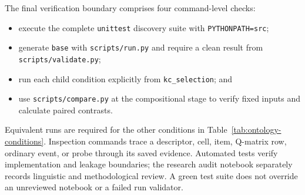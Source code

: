 The final verification boundary comprises four command-level checks:
\begin{itemize}
  \raggedright
  \item execute the complete \texttt{unittest} discovery suite with
        \texttt{PYTHONPATH=src};
  \item generate \texttt{base} with \texttt{scripts/run.py} and require a
        clean result from \texttt{scripts/validate.py};
  \item run each child condition explicitly from \texttt{kc\_selection}; and
  \item use \texttt{scripts/compare.py} at the compositional stage to verify
        fixed inputs and calculate paired contrasts.
\end{itemize}
Equivalent runs are required for the other conditions in
Table~\ref{tab:ontology-conditions}.  Inspection commands trace a descriptor,
cell, item, Q-matrix row, ordinary event, or probe through its saved evidence.
Automated tests verify implementation and leakage boundaries; the research
audit notebook separately records linguistic and methodological review.  A
green test suite does not override an unreviewed notebook or a failed run
validator.
